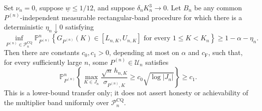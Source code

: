 Set \(\nu_n=0\), suppose \(\underline w\leq1/12\), and suppose \(\delta_nK_n^3\to0\).  Let \(B_n\) be any common \(P^{(n)}\)-independent measurable rectangular-band procedure for which there is a deterministic \(\eta_n\downarrow0\) satisfying
\[
 \inf_{P^{(n)}\in\mathcal P_n^{\mathrm{CQ}}}
 \mathbb P_{P^{(n)}}^n\!\left\{
 G_{P^{(n)}}(K)\in[L_{n,K},U_{n,K}]
 \text{ for every }1\leq K<K_n\right\}
 \geq1-\alpha-\eta_n.
\]
Then there are constants \(c_0,c_1>0\), depending at most on \(\alpha\) and \(c_{\mathrm F}\), such that, for every sufficiently large \(n\), some \(P^{(n)}\in\mathcal U_n\) satisfies
\[
 \mathbb P_{P^{(n)}}^n\!\left\{
 \max_{K\in J_n}\frac{\sqrt n\,h_{n,K}}{\sigma_{P^{(n)},K}}
 \geq c_0\sqrt{\log|J_n|}\right\}\geq c_1.
\]
This is a lower-bound transfer only; it does not assert honesty or achievability of the multiplier band uniformly over \(\mathcal P_n^{\mathrm{CQ}}\).
